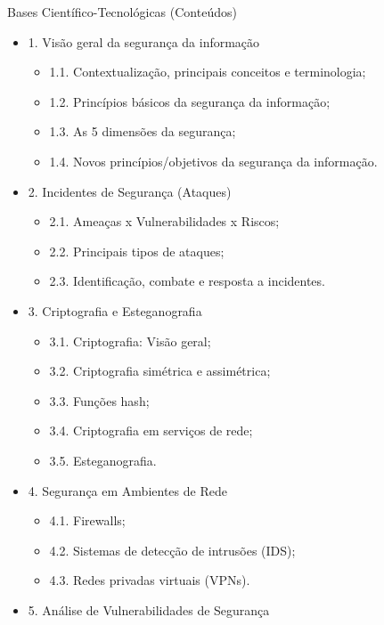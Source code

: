 \documentclass{article}
\begin{document}
\begin{center}
Bases Científico-Tecnológicas (Conteúdos)
\end{center}

\begin{itemize}
      \item 1. Visão geral da segurança da informação
      \begin{itemize} 
            \item 1.1. Contextualização, principais conceitos e terminologia;
            \item 1.2. Princípios básicos da segurança da informação;
            \item 1.3. As 5 dimensões da segurança;
            \item 1.4. Novos princípios/objetivos da segurança da informação.
      \end{itemize}
      \item 2. Incidentes de Segurança (Ataques)
      \begin{itemize} 
            \item 2.1. Ameaças x Vulnerabilidades x Riscos;
            \item 2.2. Principais tipos de ataques;
            \item 2.3. Identificação, combate e resposta a incidentes.
      \end{itemize}
      \item 3. Criptografia e Esteganografia
      \begin{itemize} 
            \item 3.1. Criptografia: Visão geral;
            \item 3.2. Criptografia simétrica e assimétrica;
            \item 3.3. Funções hash;
            \item 3.4. Criptografia em serviços de rede;
            \item 3.5. Esteganografia.
      \end{itemize}
      \item 4. Segurança em Ambientes de Rede
      \begin{itemize} 
            \item 4.1. Firewalls;
            \item 4.2. Sistemas de detecção de intrusões (IDS);
            \item 4.3. Redes privadas virtuais (VPNs).
      \end{itemize}
      \item 5. Análise de Vulnerabilidades de Segurança

\end{itemize}
\end{document}
